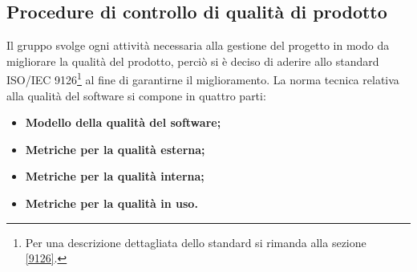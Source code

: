 \subsection{Procedure di controllo di qualità di prodotto}
Il gruppo svolge ogni attività necessaria alla gestione del progetto in modo da migliorare la qualità del prodotto, perciò si è deciso di aderire allo standard ISO/IEC 9126\footnote{Per una descrizione dettagliata dello standard si rimanda alla sezione \ref{9126}.} al fine di garantirne il miglioramento. La norma tecnica relativa alla qualità del software si compone in quattro parti:
\begin{itemize}
	\item \textbf{Modello della qualità del software;}
	\item \textbf{Metriche per la qualità esterna;}
	\item \textbf{Metriche per la qualità interna;}
	\item \textbf{Metriche per la qualità in uso.}
\end{itemize}

